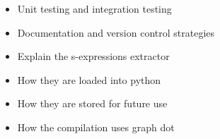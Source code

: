 \begin{itemize}
\item Unit testing and integration testing 
\item Documentation and version control strategies
\end{itemize}

\begin{itemize}
\item Explain the s-expressions extractor
\item How they are loaded into python 
\item How they are stored for future use 
\item How the compilation uses graph dot
\end{itemize}
